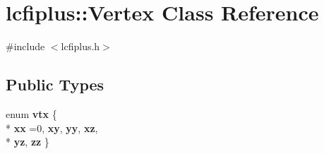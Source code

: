 \section{lcfiplus\-:\-:Vertex Class Reference}
\label{classlcfiplus_1_1Vertex}


{\ttfamily \#include $<$lcfiplus.\-h$>$}

\subsection*{Public Types}
\begin{DoxyCompactItemize}
\item 
enum {\bf vtx} \{ \\*
{\bf xx} =0, 
{\bf xy}, 
{\bf yy}, 
{\bf xz}, 
\\*
{\bf yz}, 
{\bf zz}
 \}
\end{DoxyCompactItemize}

